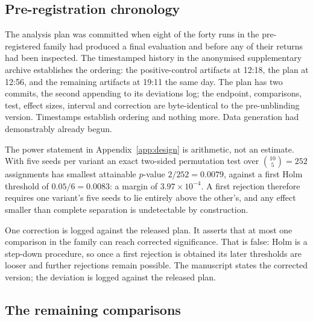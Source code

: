 \subsection{Pre-registration chronology}
\label{app:prereg}

The analysis plan was committed when eight of the forty runs in the
pre-registered family had produced a final evaluation and before any of their
returns had been inspected. The timestamped history in the anonymised
supplementary archive establishes the ordering: the
positive-control artifacts at 12:18, the plan at 12:56, and the remaining
artifacts at 19:11 the same day. The plan has two commits, the second appending
to its deviations log; the endpoint, comparisons, test, effect sizes, interval
and correction are byte-identical to the pre-unblinding version. Timestamps
establish ordering and nothing more. Data generation had demonstrably already
begun.

The power statement in Appendix~\ref{app:design} is arithmetic, not an
estimate. With five seeds per variant an exact two-sided permutation test over
$\binom{10}{5} = 252$ assignments has smallest attainable $p$-value
$2/252 = 0.0079$, against a first Holm threshold of $0.05/6 = 0.0083$: a margin
of $3.97\times10^{-4}$. A first rejection therefore requires one variant's five
seeds to lie entirely above the other's, and any effect smaller than complete
separation is undetectable by construction.

One correction is logged against the released plan. It asserts that at most one
comparison in the family can reach corrected significance. That is false: Holm
is a step-down procedure, so once a first rejection is obtained its later
thresholds are looser and further rejections remain possible. The manuscript
states the corrected version; the deviation is logged against the released plan.

\subsection{The remaining comparisons}

